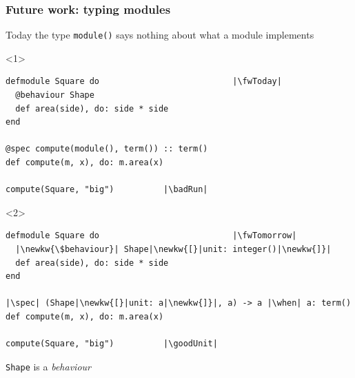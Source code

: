 \begin{frame}[fragile,t]
\frametitle{Future work: typing modules}
{\color{gray}Today the type \texttt{module()} says nothing about what a module implements\par}
\bigskip
\begin{block}{\vspace{-5mm}}
\begin{onlyenv}<1>
\begin{verbatim}
defmodule Square do                           |\fwToday|
  @behaviour Shape
  def area(side), do: side * side
end

@spec compute(module(), term()) :: term()
def compute(m, x), do: m.area(x)

compute(Square, "big")          |\badRun|
\end{verbatim}
\end{onlyenv}
\begin{onlyenv}<2>
\begin{verbatim}
defmodule Square do                           |\fwTomorrow|
  |\newkw{\$behaviour}| Shape|\newkw{[}|unit: integer()|\newkw{]}|
  def area(side), do: side * side
end

|\spec| (Shape|\newkw{[}|unit: a|\newkw{]}|, a) -> a |\when| a: term()
def compute(m, x), do: m.area(x)

compute(Square, "big")          |\goodUnit|
\end{verbatim}
\end{onlyenv}
\end{block}
\medskip
{\small\color{gray}\texttt{Shape} is a \textit{behaviour}\par}
\end{frame}

